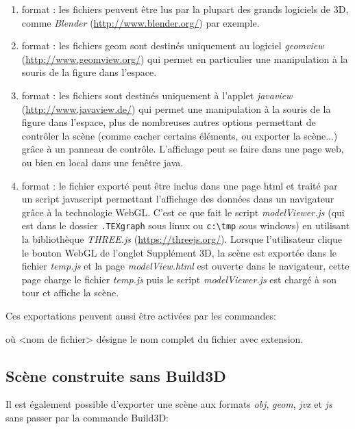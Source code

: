 \begin{enumerate}
 \item format : les fichiers  peuvent être lus par la plupart des grands logiciels de 3D, comme \textit{Blender} (\url{http://www.blender.org/}) par exemple.
 \item format : les fichiers geom sont destinés uniquement au logiciel \textit{geomview} (\url{http://www.geomview.org/}) qui permet en particulier une manipulation à la souris de la figure dans l'espace.
 \item format : les fichiers  sont destinés uniquement à l'applet \textit{javaview} (\url{http://www.javaview.de/}) qui permet une manipulation à la souris de la figure dans l'espace, plus de nombreuses autres options permettant de contrôler la scène (comme cacher certains éléments, ou exporter la scène...) grâce à un panneau de contrôle. L'affichage peut se faire dans une page web, ou bien en local dans une fenêtre java.
 \item format : le fichier  exporté peut être inclus dans une page html et traité par un script javascript permettant l'affichage des données dans un navigateur grâce à la technologie WebGL. C'est ce que fait le script \textit{modelViewer.js} (qui est dans le dossier \verb|.TEXgraph| sous linux ou \verb|c:\tmp| sous windows) en utilisant la bibliothèque \textit{THREE.js} (\url{https://threejs.org/}). Lorsque l'utilisateur clique le bouton WebGL de l'onglet Supplément 3D, la scène est exportée dans le fichier \textit{temp.js} et la page \textit{modelView.html} est ouverte dans le navigateur, cette page charge le fichier \textit{temp.js} puis le script \textit{modelViewer.js} est chargé à son tour et affiche la scène.
\end{enumerate}

Ces exportations peuvent aussi être activées par les commandes:

 où <nom de fichier> désigne le nom complet du fichier avec extension.


\subsection{Scène construite sans Build3D}

Il est également possible d'exporter une scène aux formats \textit{obj}, \textit{geom}, \textit{jvx} et \textit{js} sans passer par la commande Build3D:

